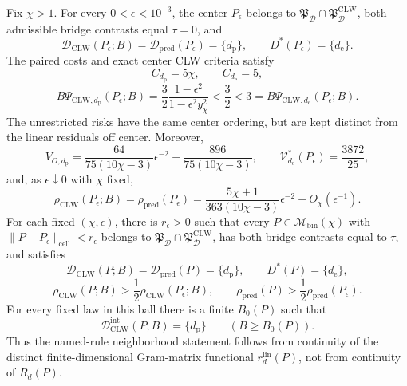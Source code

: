 Fix \(\chi>1\).  For every \(0<\epsilon<10^{-3}\), the center \(P_\epsilon\) belongs to \(\mathfrak P_{\mathcal D}\cap\mathfrak P_{\mathcal D}^{\mathrm{CLW}}\), both admissible bridge contrasts equal \(\tau=0\), and
\[
 \mathcal D_{\mathrm{CLW}}(P_\epsilon;B)
 =\mathcal D_{\mathrm{pred}}(P_\epsilon)=\{d_{\mathrm p}\},
 \qquad
 D^*(P_\epsilon)=\{d_{\mathrm e}\}.                       \tag{1}
\]
The paired costs and exact center CLW criteria satisfy
\[
 C_{d_{\mathrm p}}=5\chi,
 \qquad C_{d_{\mathrm e}}=5,
\]
\[
 B\Psi_{\mathrm{CLW},d_{\mathrm p}}(P_\epsilon;B)
 =\frac32\frac{1-\epsilon^2}{1-\epsilon^2y_\chi^2}
 <\frac32<3
 =B\Psi_{\mathrm{CLW},d_{\mathrm e}}(P_\epsilon;B).       \tag{2}
\]
The unrestricted risks have the same center ordering, but are kept distinct from the linear residuals off center.  Moreover,
\[
 V_{O,d_{\mathrm p}}
 =\frac{64}{75(10\chi-3)}\epsilon^{-2}
 +\frac{896}{75(10\chi-3)},
 \qquad
 \mathcal V_{d_{\mathrm e}}^*(P_\epsilon)=\frac{3872}{25}, \tag{3}
\]
and, as \(\epsilon\downarrow0\) with \(\chi\) fixed,
\[
 \rho_{\mathrm{CLW}}(P_\epsilon;B)
 =\rho_{\mathrm{pred}}(P_\epsilon)
 =\frac{5\chi+1}{363(10\chi-3)}\epsilon^{-2}
 +O_\chi(\epsilon^{-1}).                                  \tag{4}
\]
For each fixed \((\chi,\epsilon)\), there is \(r_\epsilon>0\) such that every \(P\in\mathcal M_{\mathrm{bin}}(\chi)\) with \(\|P-P_\epsilon\|_{\mathrm{cell}}<r_\epsilon\) belongs to \(\mathfrak P_{\mathcal D}\cap\mathfrak P_{\mathcal D}^{\mathrm{CLW}}\), has both bridge contrasts equal to \(\tau\), and satisfies
\[
 \mathcal D_{\mathrm{CLW}}(P;B)=\mathcal D_{\mathrm{pred}}(P)=\{d_{\mathrm p}\},
 \qquad D^*(P)=\{d_{\mathrm e}\},                         \tag{5}
\]
\[
 \rho_{\mathrm{CLW}}(P;B)>\frac12\rho_{\mathrm{CLW}}(P_\epsilon;B),
 \qquad
 \rho_{\mathrm{pred}}(P)>\frac12\rho_{\mathrm{pred}}(P_\epsilon). \tag{6}
\]
For every fixed law in this ball there is a finite \(B_0(P)\) such that
\[
 \mathcal D_{\mathrm{CLW}}^{\mathrm{int}}(P;B)=\{d_{\mathrm p}\}
 \qquad(B\ge B_0(P)).                                     \tag{7}
\]
Thus the named-rule neighborhood statement follows from continuity of the distinct finite-dimensional Gram-matrix functional \(r_d^{\mathrm{lin}}(P)\), not from continuity of \(R_d(P)\).